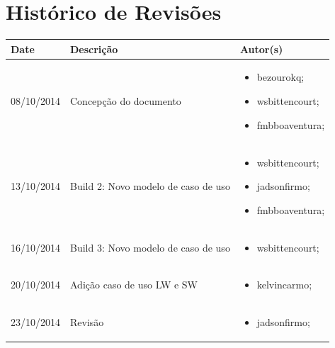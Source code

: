 \documentclass{article}
\begin{document}

\capa
\newpage

\section*{\center Histórico de Revisões}
  \vspace*{1cm}
  \begin{table}[ht]
    \centering
    \begin{tabular}[pos]{|m{2cm} | m{7.2cm} | m{3.8cm}|} 
      \hline
      \cellcolor[gray]{0.9}
      \textbf{Date} & \cellcolor[gray]{0.9}\textbf{Descrição} & \cellcolor[gray]{0.9}\textbf{Autor(s)}\\ \hline
      \hline
      \small 08/10/2014 & \small Concepção do documento & \small 
      \begin{itemize}
      	\item bezourokq;
      	\item wsbittencourt;
      	\item fmbboaventura;  
	  \end{itemize}      	
      \\ \hline
      \small 13/10/2014 & \small Build 2: Novo modelo de caso de uso & \small 
      \begin{itemize}
      	\item wsbittencourt;
      	\item jadsonfirmo;
      	\item fmbboaventura;  
	  \end{itemize}      	
      \\ \hline
      \small 16/10/2014 & \small Build 3: Novo modelo de caso de uso & \small 
      \begin{itemize}
      	\item wsbittencourt; 
	  \end{itemize} 
	  \\ \hline
      \small 20/10/2014 & \small Adição caso de uso LW e SW & \small 
      \begin{itemize}
      	\item kelvincarmo; 
	  \end{itemize} 
	  \\ \hline
	  \small 23/10/2014 & \small Revisão & \small 
      \begin{itemize}
      	\item jadsonfirmo; 
	  \end{itemize}  
	  \\ \hline
	  

\end{tabular}
\end{table}
\end{document}
